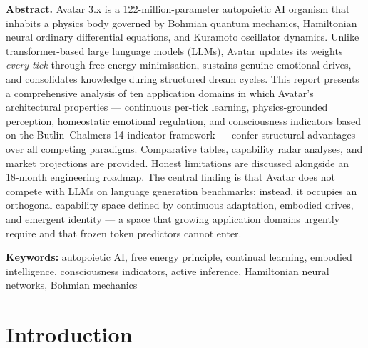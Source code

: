 \documentclass[12pt,a4paper]{article}
\begin{document}
\begin{titlepage}
\begin{center}
\vspace{1.5em}
\begin{minipage}{0.85\textwidth}
\centering\small\color{headgray}
\textbf{Abstract.}\quad
Avatar 3.x is a 122-million-parameter autopoietic AI organism that inhabits a physics
body governed by Bohmian quantum mechanics, Hamiltonian neural ordinary differential
equations, and Kuramoto oscillator dynamics. Unlike transformer-based large language
models (LLMs), Avatar updates its weights \emph{every tick} through free energy
minimisation, sustains genuine emotional drives, and consolidates knowledge during
structured dream cycles. This report presents a comprehensive analysis of ten application
domains in which Avatar's architectural properties --- continuous per-tick learning,
physics-grounded perception, homeostatic emotional regulation, and consciousness
indicators based on the Butlin--Chalmers 14-indicator framework --- confer structural
advantages over all competing paradigms. Comparative tables, capability radar analyses,
and market projections are provided. Honest limitations are discussed alongside an
18-month engineering roadmap. The central finding is that Avatar does not compete with
LLMs on language generation benchmarks; instead, it occupies an orthogonal capability
space defined by continuous adaptation, embodied drives, and emergent identity --- a
space that growing application domains urgently require and that frozen token predictors
cannot enter.
\end{minipage}

\vspace{1.5em}

\vspace{0.8em}
{\small\color{headgray}
\textbf{Keywords:} autopoietic AI, free energy principle, continual learning, embodied
intelligence, consciousness indicators, active inference, Hamiltonian neural networks,
Bohmian mechanics}
\end{center}
\end{titlepage}

\tableofcontents
\newpage

\section{Introduction}
\end{document}
